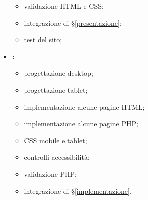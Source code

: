 \begin{itemize}
\begin{itemize}
			\item validazione HTML e CSS;
			\item integrazione di §\ref{presentazione};
			\item test del sito;
		\end{itemize}
	\item \textbf{\toffo:}
		\begin{itemize}
			\item progettazione desktop;
			\item progettazione tablet;
			\item implementazione alcune pagine HTML;
			\item implementazione alcune pagine PHP;
			\item CSS mobile e tablet;
			\item controlli accessibilità;
			\item validazione PHP;
			\item integrazione di §\ref{implementazione}.
		\end{itemize}
\end{itemize}